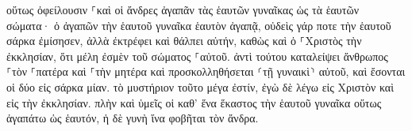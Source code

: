 \documentclass{openreader}
\begin{document}
οὕτως ὀφείλουσιν ⸀καὶ οἱ ἄνδρες ἀγαπᾶν τὰς ἑαυτῶν γυναῖκας ὡς τὰ ἑαυτῶν σώματα· ὁ ἀγαπῶν τὴν ἑαυτοῦ γυναῖκα ἑαυτὸν ἀγαπᾷ, 
οὐδεὶς γάρ ποτε τὴν ἑαυτοῦ σάρκα ἐμίσησεν, ἀλλὰ ἐκτρέφει καὶ θάλπει αὐτήν, καθὼς καὶ ὁ ⸀Χριστὸς τὴν ἐκκλησίαν, 
ὅτι μέλη ἐσμὲν τοῦ σώματος ⸀αὐτοῦ. 
ἀντὶ τούτου καταλείψει ἄνθρωπος ⸀τὸν ⸀πατέρα καὶ ⸀τὴν μητέρα καὶ προσκολληθήσεται ⸂τῇ γυναικὶ⸃ αὐτοῦ, καὶ ἔσονται οἱ δύο εἰς σάρκα μίαν. 
τὸ μυστήριον τοῦτο μέγα ἐστίν, ἐγὼ δὲ λέγω εἰς Χριστὸν καὶ εἰς τὴν ἐκκλησίαν. 
πλὴν καὶ ὑμεῖς οἱ καθ’ ἕνα ἕκαστος τὴν ἑαυτοῦ γυναῖκα οὕτως ἀγαπάτω ὡς ἑαυτόν, ἡ δὲ γυνὴ ἵνα φοβῆται τὸν ἄνδρα. 
\end{document}
